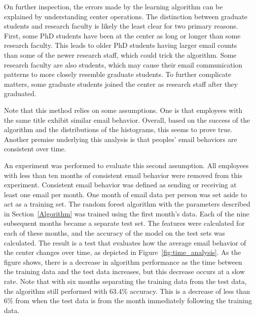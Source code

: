 \documentclass[12pt]{report}
\begin{document}
On further inspection, the errors made by the learning algorithm can be explained by understanding center operations.
The distinction between graduate students and research faculty is likely the least clear for two primary reasons.
First, some PhD students have been at the center as long or longer than some research faculty.
This leads to older PhD students having larger email counts than some of the newer research staff, which could trick the algorithm.
Some research faculty are also students, which may cause their email communication patterns to more closely resemble graduate students. 
To further complicate matters, some graduate students joined the center as research staff after they graduated.

Note that this method relies on some assumptions.
One is that employees with the same title exhibit similar email behavior.
Overall, based on the success of the algorithm and the distributions of the histograms, this seems to prove true.
Another premise underlying this analysis is that peoples' email behaviors are consistent over time.

An experiment was performed to evaluate this second assumption.
All employees with less than ten months of consistent email behavior were removed from this experiment.
Consistent email behavior was defined as sending or receiving at least one email per month.
One month of email data per person was set aside to act as a training set.
The random forest algorithm with the parameters described in Section~\ref{Algorithm} was trained using the first month's data.
Each of the nine subsequent months became a separate test set.
The features were calculated for each of these months, and the accuracy of the model on the test sets was calculated.
The result is a test that evaluates how the average email behavior of the center changes over time, as depicted in Figure~\ref{fig:time_analysis}.
As the figure shows, there is a decrease in algorithm performance as the time between the training data and the test data increases, but this decrease occurs at a slow rate.
Note that with six months separating the training data from the test data, the algorithm still performed with 63.4\% accuracy.
This is a decrease of less than 6\% from when the test data is from the month immediately following the training data.
\end{document}
